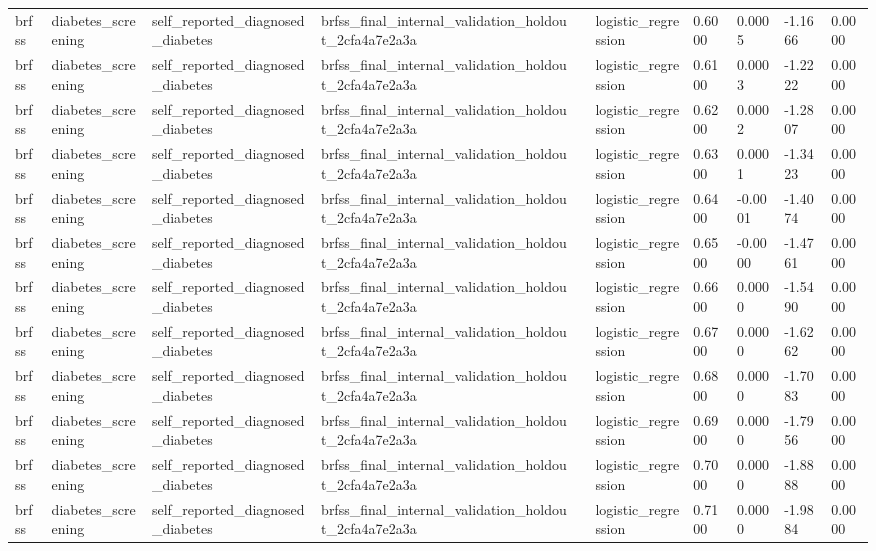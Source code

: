 \begin{tabular}{llllllllll}
brfss & diabetes\_screening & self\_reported\_diagnosed\_diabetes & brfss\_final\_internal\_validation\_holdout\_2cfa4a7e2a3a &  & logistic\_regression & 0.6000 & 0.0005 & -1.1666 & 0.0000 \\
brfss & diabetes\_screening & self\_reported\_diagnosed\_diabetes & brfss\_final\_internal\_validation\_holdout\_2cfa4a7e2a3a &  & logistic\_regression & 0.6100 & 0.0003 & -1.2222 & 0.0000 \\
brfss & diabetes\_screening & self\_reported\_diagnosed\_diabetes & brfss\_final\_internal\_validation\_holdout\_2cfa4a7e2a3a &  & logistic\_regression & 0.6200 & 0.0002 & -1.2807 & 0.0000 \\
brfss & diabetes\_screening & self\_reported\_diagnosed\_diabetes & brfss\_final\_internal\_validation\_holdout\_2cfa4a7e2a3a &  & logistic\_regression & 0.6300 & 0.0001 & -1.3423 & 0.0000 \\
brfss & diabetes\_screening & self\_reported\_diagnosed\_diabetes & brfss\_final\_internal\_validation\_holdout\_2cfa4a7e2a3a &  & logistic\_regression & 0.6400 & -0.0001 & -1.4074 & 0.0000 \\
brfss & diabetes\_screening & self\_reported\_diagnosed\_diabetes & brfss\_final\_internal\_validation\_holdout\_2cfa4a7e2a3a &  & logistic\_regression & 0.6500 & -0.0000 & -1.4761 & 0.0000 \\
brfss & diabetes\_screening & self\_reported\_diagnosed\_diabetes & brfss\_final\_internal\_validation\_holdout\_2cfa4a7e2a3a &  & logistic\_regression & 0.6600 & 0.0000 & -1.5490 & 0.0000 \\
brfss & diabetes\_screening & self\_reported\_diagnosed\_diabetes & brfss\_final\_internal\_validation\_holdout\_2cfa4a7e2a3a &  & logistic\_regression & 0.6700 & 0.0000 & -1.6262 & 0.0000 \\
brfss & diabetes\_screening & self\_reported\_diagnosed\_diabetes & brfss\_final\_internal\_validation\_holdout\_2cfa4a7e2a3a &  & logistic\_regression & 0.6800 & 0.0000 & -1.7083 & 0.0000 \\
brfss & diabetes\_screening & self\_reported\_diagnosed\_diabetes & brfss\_final\_internal\_validation\_holdout\_2cfa4a7e2a3a &  & logistic\_regression & 0.6900 & 0.0000 & -1.7956 & 0.0000 \\
brfss & diabetes\_screening & self\_reported\_diagnosed\_diabetes & brfss\_final\_internal\_validation\_holdout\_2cfa4a7e2a3a &  & logistic\_regression & 0.7000 & 0.0000 & -1.8888 & 0.0000 \\
brfss & diabetes\_screening & self\_reported\_diagnosed\_diabetes & brfss\_final\_internal\_validation\_holdout\_2cfa4a7e2a3a &  & logistic\_regression & 0.7100 & 0.0000 & -1.9884 & 0.0000 \\

\end{tabular}
